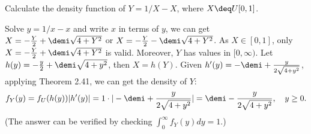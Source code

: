 \begin{exercise}
  Calculate the density function of $Y=1/X - X$, where $X\deq U[0, 1]$.
\end{exercise}
\begin{solution}
  Solve $y=1/x - x$ and write $x$ in terms of $y$, we can get $X = -\frac{Y}{2} + \demi\sqrt{4+Y^2}$ or $X = -\frac{Y}{2} - \demi\sqrt{4+Y^2}$. As $X\in[0, 1]$, only $X = -\frac{Y}{2} + \demi\sqrt{4+Y^2}$ is valid. Moreover, $Y$ has values in $[0, \infty)$. Let $h(y)=-\frac{y}{2} + \demi\sqrt{4+y^2}$, then $X=h(Y)$. Given $h'(y)=-\demi + \frac{y}{2\sqrt{4+y^2}}$, applying Theorem 2.41, we can get the density of $Y$:
  \[
    f_Y(y) = f_U(h(y))|h'(y)| = 1\cdot |-\demi+\frac{y}{2\sqrt{4+y^2}}| = \demi - \frac{y}{2\sqrt{4+y^2}}, \quad y\geq 0.
  \]
  (The answer can be verified by checking $\int_0^\infty f_Y(y)dy = 1$.)
\end{solution}
